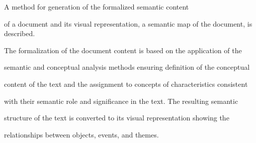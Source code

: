  \label{end\stat}





\noindent


A method for generation of the formalized semantic content 


of a document and its visual representation, a semantic map of the document, is described. 


The formalization of the document content is based on the application of the 


semantic and conceptual analysis methods ensuring definition of the conceptual 


content of the text and the assignment to concepts of characteristics consistent 


with their semantic role and significance in the text. The resulting semantic 


structure of the text is converted to its visual representation showing the 


relationships between objects, events, and themes.





\def\leftkol{ENGLISH ABSTRACTS}


\def\rightkol{ENGLISH ABSTRACTS}





\vspace*{-6pt}


     




  


